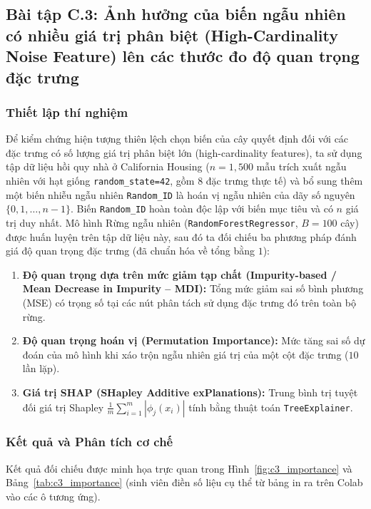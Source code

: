 \subsection{Bài tập C.3: Ảnh hưởng của biến ngẫu nhiên có nhiều giá trị phân biệt (High-Cardinality Noise Feature) lên các thước đo độ quan trọng đặc trưng}

\subsubsection{Thiết lập thí nghiệm}
Để kiểm chứng hiện tượng thiên lệch chọn biến của cây quyết định đối với các đặc trưng có số lượng giá trị phân biệt lớn (high-cardinality features), ta sử dụng tập dữ liệu hồi quy nhà ở California Housing ($n = 1{,}500$ mẫu trích xuất ngẫu nhiên với hạt giống \texttt{random\_state=42}, gồm 8 đặc trưng thực tế) và bổ sung thêm một biến nhiễu ngẫu nhiên \texttt{Random\_ID} là hoán vị ngẫu nhiên của dãy số nguyên $\{0, 1, \dots, n-1\}$. Biến \texttt{Random\_ID} hoàn toàn độc lập với biến mục tiêu và có $n$ giá trị duy nhất. Mô hình Rừng ngẫu nhiên (\texttt{RandomForestRegressor}, $B = 100$ cây) được huấn luyện trên tập dữ liệu này, sau đó ta đối chiếu ba phương pháp đánh giá độ quan trọng đặc trưng (đã chuẩn hóa về tổng bằng $1$):
\begin{enumerate}
    \item \textbf{Độ quan trọng dựa trên mức giảm tạp chất (Impurity-based / Mean Decrease in Impurity -- MDI):} Tổng mức giảm sai số bình phương (MSE) có trọng số tại các nút phân tách sử dụng đặc trưng đó trên toàn bộ rừng.
    \item \textbf{Độ quan trọng hoán vị (Permutation Importance):} Mức tăng sai số dự đoán của mô hình khi xáo trộn ngẫu nhiên giá trị của một cột đặc trưng ($10$ lần lặp).
    \item \textbf{Giá trị SHAP (SHapley Additive exPlanations):} Trung bình trị tuyệt đối giá trị Shapley $\frac{1}{m}\sum_{i=1}^{m} |\phi_j(x_i)|$ tính bằng thuật toán \texttt{TreeExplainer}.
\end{enumerate}

\subsubsection{Kết quả và Phân tích cơ chế}
Kết quả đối chiếu được minh họa trực quan trong Hình~\ref{fig:c3_importance} và Bảng~\ref{tab:c3_importance} (sinh viên điền số liệu cụ thể từ bảng in ra trên Colab vào các ô tương ứng).

